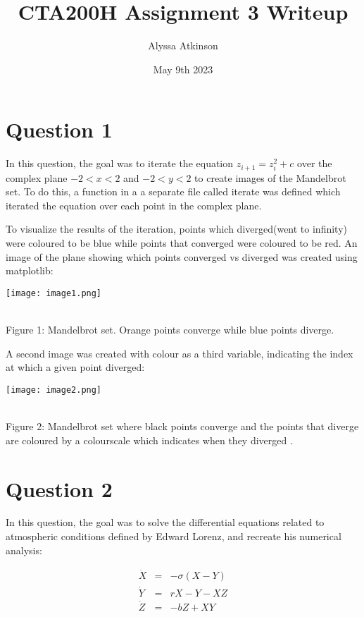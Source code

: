 \documentclass{article}
\title{CTA200H Assignment 3 Writeup}
\author{Alyssa Atkinson }
\date{May 9th 2023}
\begin{document}
\maketitle{}

\section{Question 1}

In this question, the goal was to iterate the equation $z_{i + 1} = z_i^2 + c$ over the complex plane $-2 < x < 2$ and $-2 < y < 2$ to create images of the Mandelbrot set.  To do this, a function in a  a separate file called iterate was defined which iterated the equation over each point in the complex plane. 

\hfill \break
To visualize the results of the iteration, points which diverged(went to infinity) were coloured to be blue while points that converged were coloured to be red. An image of the plane showing which points converged vs diverged was created using matplotlib:

\begin{center}
\texttt{[image: image1.png]}
\end{center}

\\\caption{Figure 1: Mandelbrot set. Orange points converge while blue points diverge.}
  \label{fig:fig1}


\hfill \break
A second image was created with colour as a third variable, indicating the index at which a given point diverged: 
\begin{center}
\texttt{[image: image2.png]}
\end{center}
\\\caption{Figure 2: Mandelbrot set where black points converge and the points that diverge are coloured by a colourscale which indicates when they diverged .}
  \label{fig:fig2}


\section{Question 2}

{In this question, the goal was to solve the differential equations related to atmospheric conditions defined by Edward Lorenz, and recreate his numerical analysis:  }

\begin{eqnarray}
\dot X &=& -\sigma(X-Y)\\
\dot Y &=& rX -Y - XZ\\
\dot Z &=& -bZ + XY
\end{eqnarray}
\end{document}
